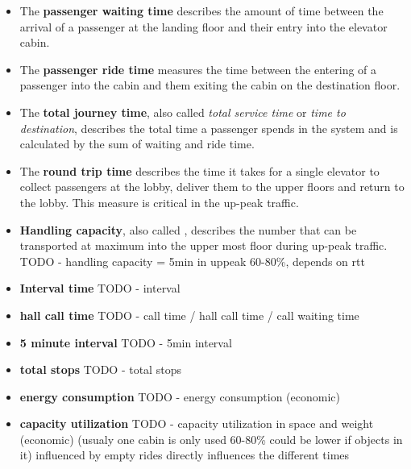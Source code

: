 \begin{itemize}

    \item The \textbf{passenger waiting time} 
        describes the amount of time between the arrival of a passenger at the landing floor 
        and their entry into the elevator cabin. 
        \autocite[][p.~7]{hakonen2003simulation}\autocite[][pp.8-9]{siikonen1997models}
        
    \item The \textbf{passenger ride time} 
        measures the time between the entering of a passenger into the cabin 
        and them exiting the cabin on the destination floor. 
    \autocite[][pp.8-9]{siikonen1997models}
    
    \item The \textbf{total journey time}, 
        also called \emph{total service time} \autocite[][p.~10]{beers2015arrivals} or \emph{time to destination},
        describes the total time a passenger spends in the system 
        and is calculated by the sum of waiting and ride time.
        \autocite[][pp.8-9]{siikonen1997models}
        
    \item The \textbf{round trip time} 
        describes the time it takes for a single elevator to collect passengers at the lobby,
        deliver them to the upper floors and return to the lobby. 
        This measure is critical in the up-peak traffic.
        \autocite[][pp.8-9]{siikonen1997models}
        
    \item \textbf{Handling capacity}, also called \autocite[][p.~194]{unger2015aufzuege}, describes the number that can be transported at maximum into the upper most floor during up-peak traffic. TODO - handling capacity = 5min in uppeak \autocite[][pp.8-9]{siikonen1997models} 60-80\%, depends on rtt
    
    \item \textbf{Interval time} TODO - interval
    
    \item \textbf{hall call time} TODO - call time / hall call time / call waiting time
    
    \item \textbf{5 minute interval} TODO - 5min interval \autocite[][p.~194]{unger2015aufzuege}
    
    \item \textbf{total stops} TODO - total stops
    
    \item \textbf{energy consumption} TODO - energy consumption (economic)
    
    \item \textbf{capacity utilization} TODO - capacity utilization in space and weight (economic)
        (usualy one cabin is only used 60-80\% could be lower if objects in it)
        \autocite[][p.~194]{unger2015aufzuege}
        \autocite[][p.~7]{hakonen2003simulation}
        influenced by empty rides
        directly influences the different times
\end{itemize}

